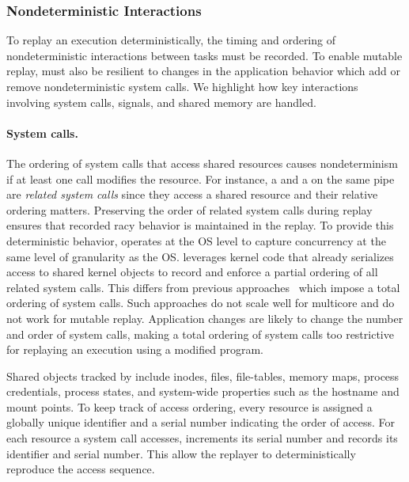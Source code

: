 \subsubsection{Nondeterministic Interactions}
To replay an execution deterministically, the timing and ordering of
nondeterministic interactions between tasks must be recorded.  To
enable mutable replay, {\dora} must also be resilient to changes in
the application behavior which add or remove nondeterministic system calls. We
highlight how key interactions involving system calls, signals, and shared
memory are handled.

\paragraph{System calls.}
The ordering of system calls that access shared resources causes nondeterminism
if at least one call modifies the resource.
For instance, a  and a  on the same
pipe are \emph{related system calls} since they access a shared resource and
their relative ordering matters.  Preserving the order of related
system calls during replay ensures that recorded racy behavior is maintained in
the replay.
To provide this deterministic behavior, {\dora} operates at the OS level to
capture concurrency at the same level of granularity as the OS.
{\dora} leverages
kernel code that already serializes access to
shared kernel objects to record and enforce a partial ordering of all related
system calls.
This differs from previous approaches~\cite{r2:osdi,srinivasan:flashback} 
which impose a total ordering of system calls.  Such approaches do
not scale well for multicore and do not work for mutable
replay. Application changes are likely to change the number and order
of system calls, making a total ordering of system calls too
restrictive for replaying an execution using a modified program.  

Shared objects tracked by {\dora} include inodes, files,
file-tables, memory maps, process credentials, process states, and
system-wide properties such as the hostname and mount points.
To keep track of access ordering, every resource is assigned a
globally unique identifier and a serial number indicating the order of access.
For each resource a system call accesses, {\dora} increments its serial
number and records its identifier and serial number. This allow
the replayer to deterministically reproduce the access sequence.

